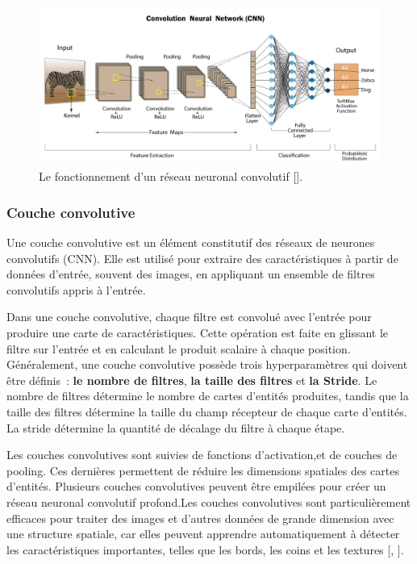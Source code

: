 \begin{figure}[hbt!]
	\centering
	\includegraphics[width=15
		cm]{images_pfe/cnn.png}
	\caption{Le fonctionnement d'un réseau neuronal convolutif [\cite{alharbi_hewahi_2021}].}
	\label{fig:cnn}
\end{figure}
\FloatBarrier
\medskip

\subsubsection{Couche convolutive}
Une couche convolutive est un élément constitutif des réseaux de neurones
convolutifs (CNN). Elle est utilisé pour extraire des caractéristiques à partir
de données d'entrée, souvent des images, en appliquant un ensemble de filtres
convolutifs appris à l'entrée.

\medskip
Dans une couche convolutive, chaque filtre est convolué avec l'entrée pour produire une carte de caractéristiques. Cette opération est faite en glissant le filtre sur l'entrée et en calculant le produit scalaire à chaque position. Généralement, une couche convolutive possède trois hyperparamètres qui doivent être définis : \textbf{le nombre de filtres}, \textbf{la taille des filtres} et \textbf{la Stride}. Le nombre de filtres détermine le nombre de cartes d'entités produites, tandis que la taille des filtres détermine la taille du champ récepteur de chaque carte d'entités. La stride détermine la quantité de décalage du filtre à chaque étape.

\medskip
Les couches convolutives sont suivies de fonctions d'activation,et de couches de pooling. Ces dernières permettent de réduire les dimensions spatiales des cartes d'entités. Plusieurs couches convolutives peuvent être empilées pour créer un réseau neuronal convolutif profond.Les couches convolutives sont particulièrement efficaces pour traiter des images et d'autres données de grande dimension avec une structure spatiale, car elles peuvent apprendre automatiquement à détecter les caractéristiques importantes, telles que les bords, les coins et les textures [\cite{kimura_yoshinaga_sekijima_azechi_baba_2019}, \cite{Goodfellow-et-al-2016}].

